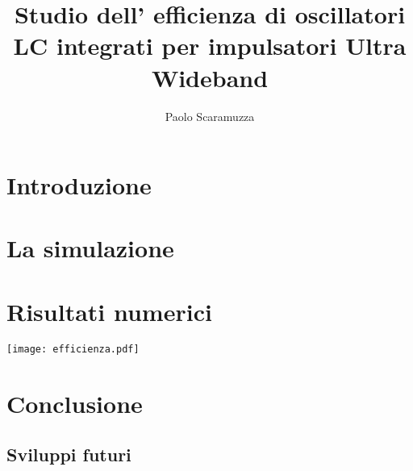 \documentclass[a4paper]{memoir}
\author{Paolo Scaramuzza}
\title{Studio dell' efficienza di oscillatori LC integrati per impulsatori 
	Ultra Wideband}
\date{} %
\begin{document}

\cleardoublepage{}
\newpage


\cleardoublepage{}
\newpage
\tableofcontents

\cleardoublepage{}
\chapter{Introduzione}

\cleardoublepage{}
\chapter{La simulazione}
\cite{Razavi11}

\cleardoublepage{}
\chapter{Risultati numerici}
\texttt{[image: efficienza.pdf]}

\cleardoublepage{}
\chapter{Conclusione}

\section{Sviluppi futuri}



\end{document}
